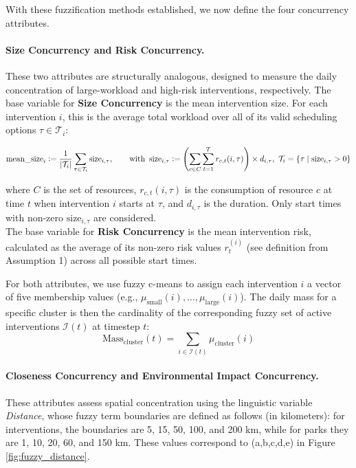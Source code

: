 With these fuzzification methods established, we now define the four concurrency attributes.

\paragraph{Size Concurrency and Risk Concurrency.}
These two attributes are structurally analogous, designed to measure the daily concentration of large-workload and high-risk interventions, respectively. The base variable for \textbf{Size Concurrency} is the mean intervention size. For each intervention $i$, this is the average total workload over all of its valid scheduling options $\tau \in \mathcal{T}_i$:

\[
    \text{mean\_size}_i \mathrel{\mathop:}= \frac{1}{|\mathcal{T}_i|} \sum_{\tau\in \mathcal{T}_i} \text{size}_{i,\tau},
    \qquad \text{with }\,
    \text{size}_{i,\tau} \mathrel{\mathop:}= \left(\sum_{c \in C} \sum_{t=1}^{\mathcal{T}} r_{c,t}(i,\tau)\right) \times d_{i,\tau}, \,\, \mathcal{T}_i = \{ \tau \mid \text{size}_{i,\tau} > 0 \}
\]

where \(C\) is the set of resources, \(r_{c,t}(i,\tau)\) is the consumption of resource \(c\) at time \(t\) when intervention \(i\) starts at \(\tau\), and \(d_{i,\tau}\) is the duration. Only start times with non-zero \(\text{size}_{i,\tau}\) are considered. \\
The base variable for \textbf{Risk Concurrency} is the mean intervention risk, calculated as the average of its non-zero risk values $r_t^{(i)}$ (see definition from Assumption 1) across all possible start times. 

For both attributes, we use fuzzy c-means to assign each intervention $i$ a vector of five membership values (e.g., $\mu_{\text{small}}(i), \dots, \mu_{\text{large}}(i)$). The daily mass for a specific cluster is then the cardinality of the corresponding fuzzy set of active interventions $\mathcal{I}(t)$ at timestep $t$:
\[
    \text{Mass}_{\text{cluster}}(t) = \sum_{i \in \mathcal{I}(t)} \mu_{\text{cluster}}(i)
\]


    
    


\paragraph{Closeness Concurrency and Environmental Impact Concurrency.}
These attributes assess spatial concentration using the linguistic variable \textit{Distance}, whose fuzzy term boundaries are defined as follows (in kilometers): for interventions, the boundaries are 5, 15, 50, 100, and 200 km, while for parks they are 1, 10, 20, 60, and 150 km. These values correspond to (a,b,c,d,e) in Figure \ref{fig:fuzzy_distance}.

